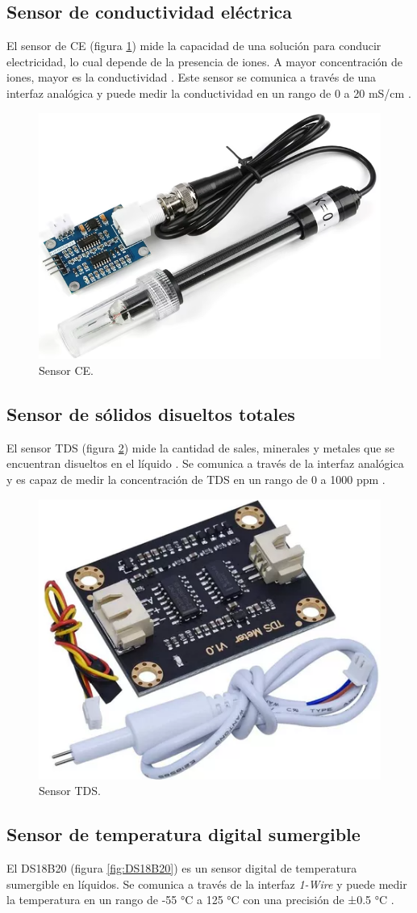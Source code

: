 \subsection{Sensor de conductividad eléctrica}

El sensor de CE (figura \ref{fig:CE}) mide la capacidad de una solución para
conducir electricidad, lo cual depende de la presencia de iones. A mayor
concentración de iones, mayor es la conductividad \cite{MTConductivitySensor}.
Este sensor se comunica a través de una interfaz analógica y puede medir la
conductividad en un rango de 0 a 20 mS/cm \cite{EC-Sensor}.

\begin{figure}[H]
	\centering
	\includegraphics[height=.15\textwidth]{./Images/8.png}
	\caption{Sensor CE.}
	\label{fig:CE}
\end{figure}

\subsection{Sensor de sólidos disueltos totales}

El sensor TDS (figura \ref{fig:TDS}) mide la cantidad de sales, minerales y
metales que se encuentran disueltos en el líquido \cite{TDS-description}. Se
comunica a través de la interfaz analógica y es capaz de medir la concentración
de TDS en un rango de 0 a 1000 ppm \cite{TDS-Sensor}.

\begin{figure}[H]
	\centering
	\includegraphics[height=.15\textwidth]{./Images/9.png}
	\caption{Sensor TDS.}
	\label{fig:TDS}
\end{figure}

\subsection{Sensor de temperatura digital sumergible}

El DS18B20 (figura \ref{fig:DS18B20}) es un sensor digital de temperatura
sumergible en líquidos. Se comunica a través de la interfaz \textit{1-Wire} y puede
medir la temperatura en un rango de -55 °C a 125 °C con una precisión de ±0.5
°C \cite{DS18B20}.

